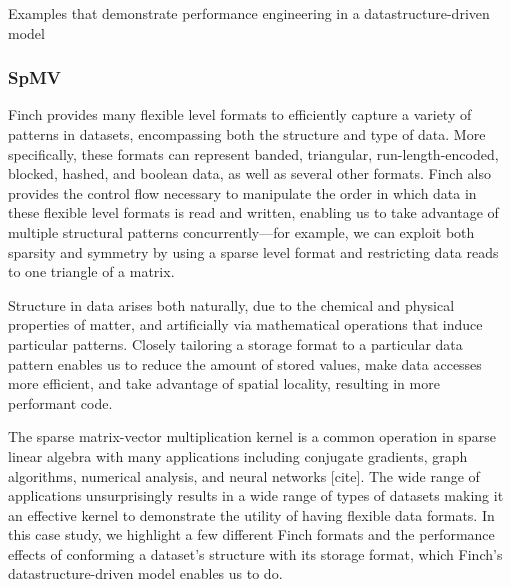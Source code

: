 Examples that demonstrate performance engineering in a datastructure-driven model

\subsubsection{SpMV}
Finch provides many flexible level formats to efficiently capture a variety of patterns in datasets, encompassing both the structure and type of data. More specifically, these formats can represent banded, triangular, run-length-encoded, blocked, hashed, and boolean data, as well as several other formats.  Finch also provides the control flow necessary to manipulate the order in which data in these flexible level formats is read and written, enabling us to take advantage of multiple structural patterns concurrently—for example, we can exploit both sparsity and symmetry by using a sparse level format and restricting data reads to one triangle of a matrix. 

Structure in data arises both naturally, due to the chemical and physical properties of matter, and artificially via mathematical operations that induce particular patterns.  Closely tailoring a storage format to a particular data pattern enables us to reduce the amount of stored values, make data accesses more efficient, and take advantage of spatial locality, resulting in more performant code.

 The sparse matrix-vector multiplication kernel is a common operation in sparse linear algebra with many applications including conjugate gradients, graph algorithms, numerical analysis, and neural networks [cite].  The wide range of applications unsurprisingly results in a wide range of types of datasets making it an effective kernel to demonstrate the utility of having flexible data formats. In this case study, we highlight a few different Finch formats and the performance effects of conforming a dataset’s structure with its storage format, which Finch's datastructure-driven model enables us to do.

